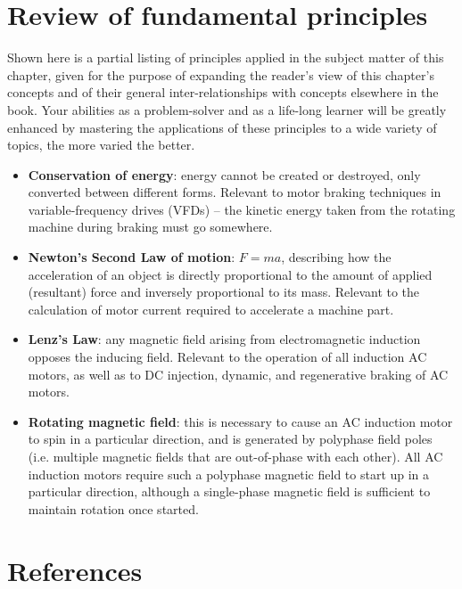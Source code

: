\filbreak
\section{Review of fundamental principles}

Shown here is a partial listing of principles applied in the subject matter of this chapter, given for the purpose of expanding the reader's view of this chapter's concepts and of their general inter-relationships with concepts elsewhere in the book.  Your abilities as a problem-solver and as a life-long learner will be greatly enhanced by mastering the applications of these principles to a wide variety of topics, the more varied the better.

\begin{itemize}
\item \textbf{Conservation of energy}: energy cannot be created or destroyed, only converted between different forms.  Relevant to motor braking techniques in variable-frequency drives (VFDs) -- the kinetic energy taken from the rotating machine during braking must go somewhere.
\item \textbf{Newton's Second Law of motion}: $F = ma$, describing how the acceleration of an object is directly proportional to the amount of applied (resultant) force and inversely proportional to its mass.  Relevant to the calculation of motor current required to accelerate a machine part.
\item \textbf{Lenz's Law}: any magnetic field arising from electromagnetic induction opposes the inducing field.  Relevant to the operation of all induction AC motors, as well as to DC injection, dynamic, and regenerative braking of AC motors.
\item \textbf{Rotating magnetic field}: this is necessary to cause an AC induction motor to spin in a particular direction, and is generated by polyphase field poles (i.e. multiple magnetic fields that are out-of-phase with each other).  All AC induction motors require such a polyphase magnetic field to start up in a particular direction, although a single-phase magnetic field is sufficient to maintain rotation once started.
\end{itemize}











\filbreak
\section*{References}

